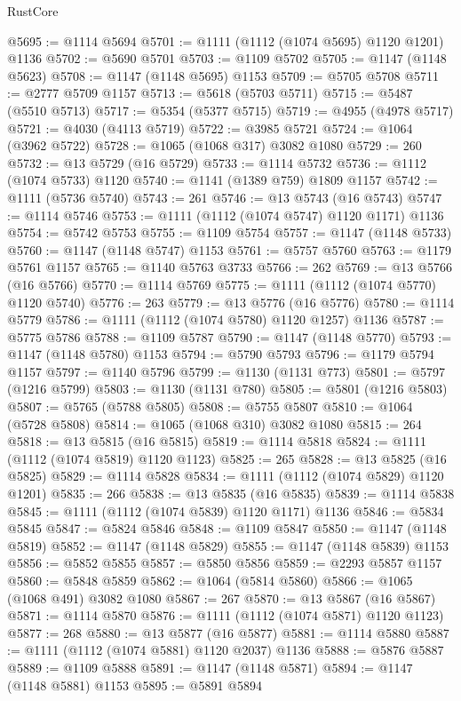 \begin{lexlean}{RustCore}
\begin{coremodule}
@5695 := @1114 @5694
@5701 := @1111 (@1112 (@1074 @5695) @1120 @1201) @1136
@5702 := @5690 @5701
@5703 := @1109 @5702
@5705 := @1147 (@1148 @5623)
@5708 := @1147 (@1148 @5695) @1153
@5709 := @5705 @5708
@5711 := @2777 @5709 @1157
@5713 := @5618 (@5703 @5711)
@5715 := @5487 (@5510 @5713)
@5717 := @5354 (@5377 @5715)
@5719 := @4955 (@4978 @5717)
@5721 := @4030 (@4113 @5719)
@5722 := @3985 @5721
@5724 := @1064 (@3962 @5722)
@5728 := @1065 (@1068 @317) @3082 @1080
@5729 := 260
@5732 := @13 @5729 (@16 @5729)
@5733 := @1114 @5732
@5736 := @1112 (@1074 @5733) @1120
@5740 := @1141 (@1389 @759) @1809 @1157
@5742 := @1111 (@5736 @5740)
@5743 := 261
@5746 := @13 @5743 (@16 @5743)
@5747 := @1114 @5746
@5753 := @1111 (@1112 (@1074 @5747) @1120 @1171) @1136
@5754 := @5742 @5753
@5755 := @1109 @5754
@5757 := @1147 (@1148 @5733)
@5760 := @1147 (@1148 @5747) @1153
@5761 := @5757 @5760
@5763 := @1179 @5761 @1157
@5765 := @1140 @5763 @3733
@5766 := 262
@5769 := @13 @5766 (@16 @5766)
@5770 := @1114 @5769
@5775 := @1111 (@1112 (@1074 @5770) @1120 @5740)
@5776 := 263
@5779 := @13 @5776 (@16 @5776)
@5780 := @1114 @5779
@5786 := @1111 (@1112 (@1074 @5780) @1120 @1257) @1136
@5787 := @5775 @5786
@5788 := @1109 @5787
@5790 := @1147 (@1148 @5770)
@5793 := @1147 (@1148 @5780) @1153
@5794 := @5790 @5793
@5796 := @1179 @5794 @1157
@5797 := @1140 @5796
@5799 := @1130 (@1131 @773)
@5801 := @5797 (@1216 @5799)
@5803 := @1130 (@1131 @780)
@5805 := @5801 (@1216 @5803)
@5807 := @5765 (@5788 @5805)
@5808 := @5755 @5807
@5810 := @1064 (@5728 @5808)
@5814 := @1065 (@1068 @310) @3082 @1080
@5815 := 264
@5818 := @13 @5815 (@16 @5815)
@5819 := @1114 @5818
@5824 := @1111 (@1112 (@1074 @5819) @1120 @1123)
@5825 := 265
@5828 := @13 @5825 (@16 @5825)
@5829 := @1114 @5828
@5834 := @1111 (@1112 (@1074 @5829) @1120 @1201)
@5835 := 266
@5838 := @13 @5835 (@16 @5835)
@5839 := @1114 @5838
@5845 := @1111 (@1112 (@1074 @5839) @1120 @1171) @1136
@5846 := @5834 @5845
@5847 := @5824 @5846
@5848 := @1109 @5847
@5850 := @1147 (@1148 @5819)
@5852 := @1147 (@1148 @5829)
@5855 := @1147 (@1148 @5839) @1153
@5856 := @5852 @5855
@5857 := @5850 @5856
@5859 := @2293 @5857 @1157
@5860 := @5848 @5859
@5862 := @1064 (@5814 @5860)
@5866 := @1065 (@1068 @491) @3082 @1080
@5867 := 267
@5870 := @13 @5867 (@16 @5867)
@5871 := @1114 @5870
@5876 := @1111 (@1112 (@1074 @5871) @1120 @1123)
@5877 := 268
@5880 := @13 @5877 (@16 @5877)
@5881 := @1114 @5880
@5887 := @1111 (@1112 (@1074 @5881) @1120 @2037) @1136
@5888 := @5876 @5887
@5889 := @1109 @5888
@5891 := @1147 (@1148 @5871)
@5894 := @1147 (@1148 @5881) @1153
@5895 := @5891 @5894

\end{coremodule}
\end{lexlean}
